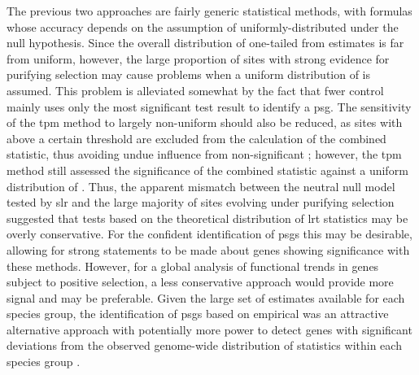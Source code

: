The previous two approaches are fairly generic statistical methods,
with formulas whose accuracy depends on the assumption of
uniformly-distributed \pvs under the null hypothesis. Since the
overall distribution of one-tailed \pvs from \sw estimates is far from
uniform, however, the large proportion of sites with strong evidence
for purifying selection may cause problems when a uniform distribution
of \pvs is assumed. This problem is alleviated somewhat by the fact
that \ac{fwer} control mainly uses only the most significant test
result to identify a \ac{psg}. The sensitivity of the \ac{tpm} method
to largely non-uniform \pvs should also be reduced, as sites with \pvs
above a certain threshold are excluded from the calculation of the
combined statistic, thus avoiding undue influence from non-significant
\pvs; however, the \ac{tpm} method still assessed the significance of
the combined statistic against a uniform distribution of \pvs. Thus,
the apparent mismatch between the neutral null model tested by
\ac{slr} and the large majority of sites evolving under purifying
selection suggested that tests based on the theoretical distribution
of \ac{lrt} statistics may be overly conservative. For the confident
identification of \acp{psg} this may be desirable, allowing for strong
statements to be made about genes showing significance with these
methods. However, for a global analysis of functional trends in genes
subject to positive selection, a less conservative approach would
provide more signal and may be preferable. Given the large set of \sw
estimates available for each species group, the identification of
\acp{psg} based on empirical \pvs was an attractive alternative
approach with potentially more power to detect genes with significant
deviations from the observed genome-wide distribution of \slrt
statistics within each species group \citep{Noble2009a}.

